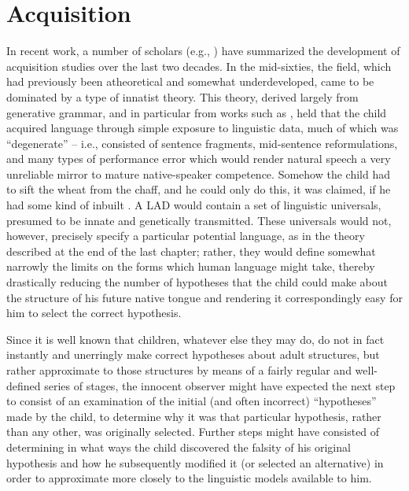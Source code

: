 \chapter{Acquisition} \label{ch:3}

In recent work, a number of scholars (e.g., \citealt{Bruner1979,Snow1979}) have summarized the development of acquisition studies over the last two decades. In the mid-sixties, the field, which had previously been atheoretical and somewhat underdeveloped, came to be dominated by a type of innatist theory. This theory, derived largely from generative grammar, and in particular from works such as \citet{Chomsky1962}, held that the child acquired language through simple exposure to linguistic data, much of which was ``degenerate'' -- i.e., consisted of sentence fragments, mid-sentence reformulations, and many types of performance error which would render natural speech a very unreliable mirror to mature native-speaker competence. Somehow the child had to sift the wheat from the chaff, and he could only do this, it was claimed, if he had some kind of inbuilt . A LAD would contain a set of linguistic universals, presumed to be innate and genetically transmitted. These universals would not, however, precisely specify a particular potential language, as in the theory described at the end of the last chapter; rather, they would define somewhat narrowly the limits on the forms which human language might take, thereby drastically reducing the number of hypotheses that the child could make about the structure of his future native tongue and rendering it correspondingly easy for him to select the correct hypothesis.

Since it is well known that children, whatever else they may do, do not in fact instantly and unerringly make correct hypotheses about adult structures, but rather approximate to those structures by means of a fairly regular and well-defined series of stages, the innocent observer might have expected the next step to consist of an examination of the initial (and often incorrect) ``hypotheses'' made by the child, to determine why it was that particular hypothesis, rather than any other, was originally selected. Further steps might have consisted of determining in what ways the child discovered the falsity of his original hypothesis and how he subsequently modified it (or selected an alternative) in order to approximate more closely to the linguistic models available to him.

